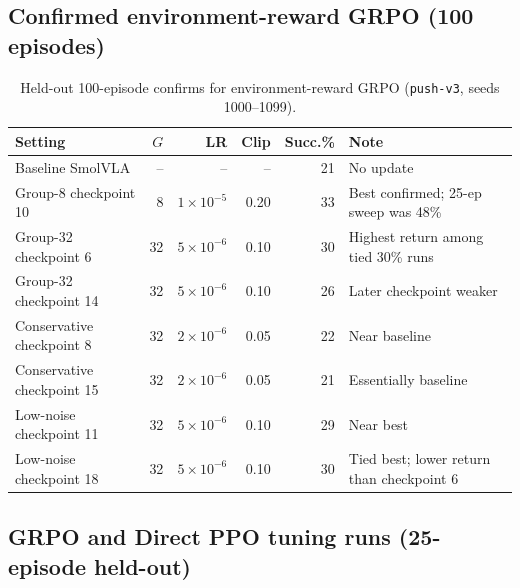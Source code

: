 \subsection{Confirmed environment-reward GRPO (100 episodes)}
\label{sec:supp-grpo-100ep}

\begin{table}[H]
\centering
\caption{Held-out 100-episode confirms for environment-reward GRPO (\texttt{push-v3}, seeds 1000--1099).}
\label{tab:supp-grpo-100ep}
\small
\begin{tabular}{@{}lrrrrl@{}}
\toprule
Setting & $G$ & LR & Clip & Succ.\% & Note \\
\midrule
Baseline SmolVLA & -- & -- & -- & 21 & No update \\
Group-8 checkpoint 10 & 8 & $1{\times}10^{-5}$ & 0.20 & 33 & Best confirmed; 25-ep sweep was 48\% \\
Group-32 checkpoint 6 & 32 & $5{\times}10^{-6}$ & 0.10 & 30 & Highest return among tied 30\% runs \\
Group-32 checkpoint 14 & 32 & $5{\times}10^{-6}$ & 0.10 & 26 & Later checkpoint weaker \\
Conservative checkpoint 8 & 32 & $2{\times}10^{-6}$ & 0.05 & 22 & Near baseline \\
Conservative checkpoint 15 & 32 & $2{\times}10^{-6}$ & 0.05 & 21 & Essentially baseline \\
Low-noise checkpoint 11 & 32 & $5{\times}10^{-6}$ & 0.10 & 29 & Near best \\
Low-noise checkpoint 18 & 32 & $5{\times}10^{-6}$ & 0.10 & 30 & Tied best; lower return than checkpoint 6 \\
\bottomrule
\end{tabular}
\end{table}

\subsection{GRPO and Direct PPO tuning runs (25-episode held-out)}
\label{sec:supp-grpo-direct-25ep}

